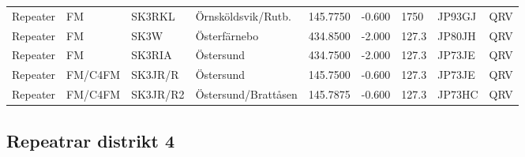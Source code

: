 {\begin{landscape}
\begin{longtable}{llllrrlll}
	Repeater          & FM              & SK3RKL   & Örnsköldsvik/Rutb.  &     145.7750 &     -0.600 & 1750               & JP93GJ      & QRV      \\
	Repeater          & FM              & SK3W     & Österfärnebo        &     434.8500 &     -2.000 & 127.3              & JP80JH      & QRV      \\
	Repeater          & FM              & SK3RIA   & Östersund           &     434.7500 &     -2.000 & 127.3              & JP73JE      & QRV      \\
	Repeater          & FM/C4FM         & SK3JR/R  & Östersund           &     145.7500 &     -0.600 & 127.3              & JP73JE      & QRV      \\
	Repeater          & FM/C4FM         & SK3JR/R2 & Östersund/Brattåsen &     145.7875 &     -0.600 & 127.3              & JP73HC      & QRV
\end{longtable}


\clearpage

\subsection{Repeatrar distrikt 4}



\end{landscape}}
